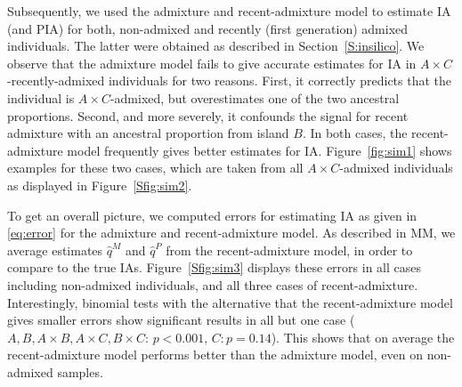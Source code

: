 \documentclass[12pt]{article}
\theoremstyle{definition}
\begin{document}
Subsequently, we used the admixture and recent-admixture model to
estimate IA (and PIA) for both, non-admixed and recently (first
generation) admixed individuals. The latter were obtained as described
in Section~\ref{S:insilico}. We observe that the admixture model fails
to give accurate estimates for IA in $A\times C$-recently-admixed
individuals for two reasons. First, it correctly predicts that the
individual is $A\times C$-admixed, but overestimates one of the two
ancestral proportions. Second, and more severely, it confounds the
signal for recent admixture with an ancestral proportion from island
$B$. In both cases, the recent-admixture model frequently gives better
estimates for IA. Figure~\ref{fig:sim1} shows examples for these two
cases, which are taken from all $A\times C$-admixed individuals as
displayed in Figure~\ref{Sfig:sim2}.

To get an overall picture, we computed errors for estimating IA as
given in \eqref{eq:error} for the admixture and recent-admixture
model. As described in MM, we average estimates $\hat q^M$ and
$\hat q^P$ from the recent-admixture model, in order to compare to the
true IAs. Figure~\ref{Sfig:sim3} displays these errors in all cases
including non-admixed individuals, and all three cases of
recent-admixture. Interestingly, binomial tests with the alternative
that the recent-admixture model gives smaller errors show significant
results in all but one case ($A, B, A\times B, A\times C, B\times C$:
$p<0.001$, $C: p=0.14$). This shows that on average the
recent-admixture model performs better than the admixture model, even
on non-admixed samples.
\end{document}
